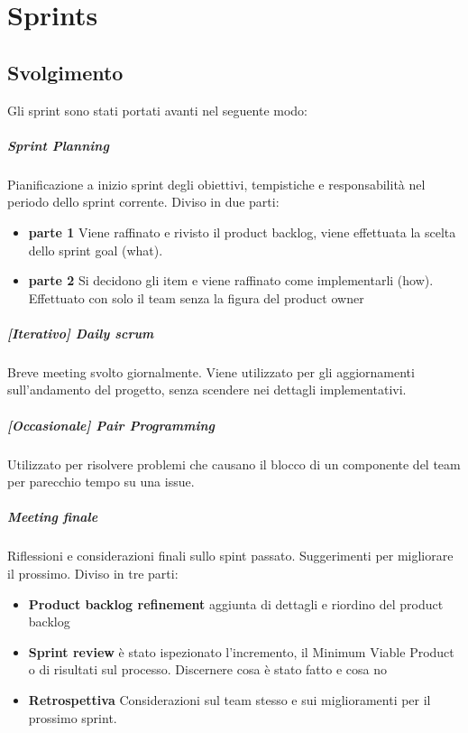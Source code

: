 \chapter{Sprints}

\section{Svolgimento}
Gli sprint sono stati portati avanti nel seguente modo:
    \paragraph{Sprint Planning}
        Pianificazione a inizio sprint degli obiettivi, tempistiche e responsabilità nel periodo dello sprint corrente. Diviso in due parti:
        \begin{itemize}
        \item\textbf{parte 1} 
            Viene raffinato e rivisto il product backlog, viene effettuata la scelta dello sprint goal (what).
        \item\textbf{parte 2}
            Si decidono gli item e viene raffinato come implementarli (how). Effettuato con solo il team senza la figura del product owner
        \end{itemize}
    \paragraph{[Iterativo] Daily scrum} Breve meeting svolto giornalmente. Viene utilizzato per gli aggiornamenti sull'andamento del progetto, senza scendere nei dettagli implementativi.
    \paragraph{[Occasionale] Pair Programming } Utilizzato per risolvere problemi che causano il blocco di un componente del team per parecchio tempo su una issue.
    \paragraph{Meeting finale}
        Riflessioni e considerazioni finali sullo spint passato. Suggerimenti per migliorare il prossimo. Diviso in tre parti: 
        \begin{itemize}
        \item\textbf{Product backlog refinement} aggiunta di dettagli e riordino del product backlog
        \item\textbf{Sprint review} è stato ispezionato l'incremento, il Minimum Viable Product o di risultati sul processo. Discernere cosa è stato fatto e cosa no
        \item\textbf{Retrospettiva} Considerazioni sul team stesso e sui miglioramenti per il prossimo sprint. 
        \end{itemize}
        

